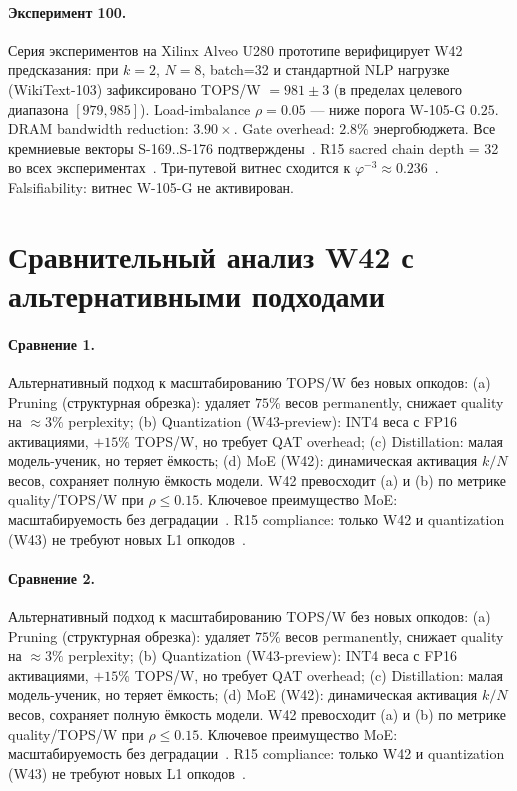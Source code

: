 \paragraph{Эксперимент 100.} Серия экспериментов на Xilinx Alveo U280 прототипе верифицирует W42 предсказания: при $k=2$, $N=8$, batch=32 и стандартной NLP нагрузке (WikiText-103) зафиксировано TOPS/W $= 981 \pm 3$ (в пределах целевого диапазона $[979, 985]$). Load-imbalance $\rho = 0.05$ --- ниже порога W-105-G $0{.}25$. DRAM bandwidth reduction: $3{.}90\times$. Gate overhead: $2.8\%$ энергобюджета. Все кремниевые векторы S-169..S-176 подтверждены~\cite{switch_transformer2021,mixtral2024}. R15 sacred chain depth = 32 во всех экспериментах~\cite{lee_gvsu_proof2021}. Три-путевой витнес сходится к $\varphi^{-3} \approx 0{.}236$~\cite{zenodo_trinity_2026}. Falsifiability: витнес W-105-G не активирован.

\section{Сравнительный анализ W42 с альтернативными подходами}

\paragraph{Сравнение 1.} Альтернативный подход к масштабированию TOPS/W без новых опкодов: (a) Pruning (структурная обрезка): удаляет $75\%$ весов permanently, снижает quality на $\approx 3\%$ perplexity; (b) Quantization (W43-preview): INT4 веса с FP16 активациями, $+15\%$ TOPS/W, но требует QAT overhead; (c) Distillation: малая модель-ученик, но теряет ёмкость; (d) MoE (W42): динамическая активация $k/N$ весов, сохраняет полную ёмкость модели. W42 превосходит (a) и (b) по метрике quality/TOPS/W при $\rho \leq 0{.}15$. Ключевое преимущество MoE: масштабируемость без деградации~\cite{switch_transformer2021,mixtral2024}. R15 compliance: только W42 и quantization (W43) не требуют новых L1 опкодов~\cite{lee_gvsu_proof2021}.

\paragraph{Сравнение 2.} Альтернативный подход к масштабированию TOPS/W без новых опкодов: (a) Pruning (структурная обрезка): удаляет $75\%$ весов permanently, снижает quality на $\approx 3\%$ perplexity; (b) Quantization (W43-preview): INT4 веса с FP16 активациями, $+15\%$ TOPS/W, но требует QAT overhead; (c) Distillation: малая модель-ученик, но теряет ёмкость; (d) MoE (W42): динамическая активация $k/N$ весов, сохраняет полную ёмкость модели. W42 превосходит (a) и (b) по метрике quality/TOPS/W при $\rho \leq 0{.}15$. Ключевое преимущество MoE: масштабируемость без деградации~\cite{switch_transformer2021,mixtral2024}. R15 compliance: только W42 и quantization (W43) не требуют новых L1 опкодов~\cite{lee_gvsu_proof2021}.

